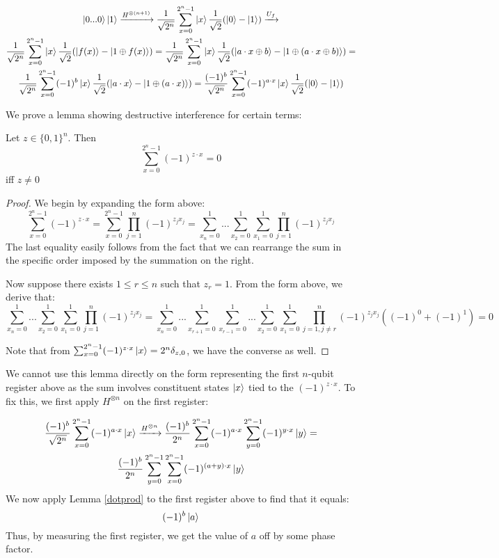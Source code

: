 \begin{gather}
  \ket{0...0}\ket{1}\xrightarrow{H^{\otimes (n+1)}} \frac{1}{\sqrt{2^n}} \sum_{x=0}^{2^n-1}\ket{x}\frac{1}{\sqrt{2}}(\ket{0} - \ket{1}) \xrightarrow{U_f} \\
  \frac{1}{\sqrt{2^n}} \sum_{x=0}^{2^n-1}\ket{x}\frac{1}{\sqrt{2}}(\ket{f(x)} - \ket{1\oplus f(x)}) = \frac{1}{\sqrt{2^n}} \sum_{x=0}^{2^n-1}\ket{x}\frac{1}{\sqrt{2}}(\ket{a\cdot x \oplus b} - \ket{1 \oplus (a \cdot x \oplus b)}) = \\
  \frac{1}{\sqrt{2^n}} \sum_{x=0}^{2^n-1}(-1)^b \ket{x}\frac{1}{\sqrt{2}}(\ket{a\cdot x} - \ket{1 \oplus (a \cdot x)}) = \frac{(-1)^b}{\sqrt{2^n}} \sum_{x=0}^{2^n-1}(-1)^{a\cdot x}\ket{x}\frac{1}{\sqrt{2}}(\ket{0} - \ket{1})
\end{gather}

We prove a lemma showing destructive interference for certain terms: \newline

\begin{lemma} \label{dotprod}
  Let $z \in \{0,1\}^n$. Then
  $$\sum_{x=0}^{2^n-1} (-1)^{z \cdot x} = 0$$ iff $z \neq 0$
\end{lemma}
\begin{proof}
   We begin by expanding the form above:
   $$\sum_{x=0}^{2^n-1} (-1)^{z \cdot x} = \sum_{x=0}^{2^n -1}\prod_{j=1}^n (-1)^{z_jx_j} = \sum_{x_n = 0}^1...\sum_{x_2 = 0}^1\sum_{x_1 = 0}^1 \prod_{j=1}^n (-1)^{z_jx_j}   $$
   The last equality easily follows from the fact that we can rearrange the sum in the specific order imposed by the summation on the right.

   Now suppose there exists $1 \leq r \leq n$ such that $z_r = 1$. From the form above, we derive that:
   $$\sum_{x_n = 0}^1...\sum_{x_2 = 0}^1\sum_{x_1 = 0}^1 \prod_{j=1}^n (-1)^{z_jx_j} = \sum_{x_n = 0}^1...\sum_{x_{r+1} = 0}^1\sum_{x_{r-1} = 0}^1... \sum_{x_2 = 0}^1\sum_{x_1 = 0}^1 \prod_{j=1,j \neq r}^n (-1)^{z_jx_j} ((-1)^0 + (-1)^1) = 0 $$

   Note that from $\sum_{x=0}^{2^n-1} (-1)^{z \cdot x} \ket{x} = 2^n\delta_{z,0}$, we have the converse as well.
\end{proof}

We cannot use this lemma directly on the form representing the first $n$-qubit register above as the sum involves constituent states $\ket{x}$ tied to the $(-1)^{z\cdot x}$. To fix this, we first apply $H^{\otimes n}$ on the first register:

\begin{gather}
  \frac{(-1)^b}{\sqrt{2^n}} \sum_{x=0}^{2^n-1}(-1)^{a\cdot x}\ket{x} \xrightarrow{H^{\otimes n}} \frac{(-1)^b}{2^n}\sum_{x=0}^{2^n -1}  (-1)^{a\cdot x} \sum_{y=0}^{2^n -1} (-1)^{y \cdot x} \ket{y} = \\
  \frac{(-1)^b}{2^n}\sum_{y=0}^{2^n -1} \sum_{x=0}^{2^n -1} (-1)^{(a+y)\cdot x} \ket{y}
\end{gather}
%
We now apply Lemma \ref{dotprod} to the first register above to find that it equals:
$$(-1)^b \ket{a} $$ Thus, by measuring the first register, we get the value of $a$ off by some phase factor.

